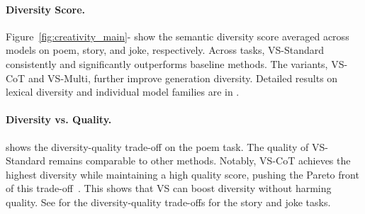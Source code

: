 


\paragraph{Diversity Score.} Figure~\ref{fig:creativity_main}- show the semantic diversity score averaged across models on poem, story, and joke, respectively. %
Across tasks, VS-Standard consistently and significantly outperforms baseline methods. The variants, VS-CoT and VS-Multi, further improve generation diversity. Detailed results on lexical diversity and individual model families are in .

\paragraph{Diversity vs. Quality.}  shows the diversity-quality trade-off on the poem task. The quality of VS-Standard remains comparable to other methods. Notably, VS-CoT achieves the highest diversity while maintaining a high quality score, pushing the Pareto front of this trade-off~\citep {zhang-etal-2021-trading}. This shows that VS can boost diversity without harming quality. See  for the diversity-quality trade-offs for the story and joke tasks.


